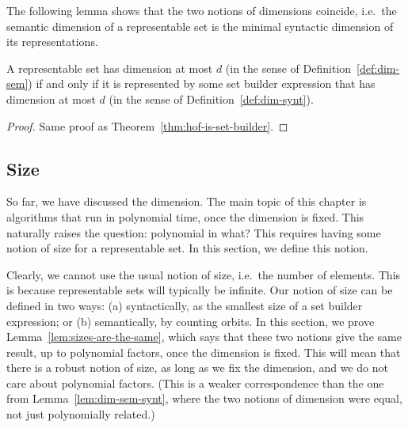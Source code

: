 The following lemma shows that the two notions of  dimensions coincide, i.e.~the semantic dimension of a representable  set is the minimal syntactic dimension of its representations.

\begin{lemma}\label{lem:dim-sem-synt}
    A representable set has dimension at most $d$ (in the sense of Definition~\ref{def:dim-sem}) if and only if it is represented by some set builder expression that has dimension at most $d$ (in the sense of Definition~\ref{def:dim-synt}). 
\end{lemma}
\begin{proof}
    Same proof as Theorem~\ref{thm:hof-is-set-builder}.
\end{proof}

\subsection{Size}
So far, we have discussed the dimension. The main topic of this chapter is algorithms that run in polynomial time, once the dimension is fixed. This naturally raises the question: polynomial in what? This requires having some notion of size for a representable set. In this section, we define this notion. 

Clearly, we cannot use the usual notion of size, i.e.~the number of elements. This is because representable sets  will typically be infinite. Our notion of size can be defined in two ways: (a) syntactically, as the smallest size of a set builder expression; or (b) semantically, by counting orbits. In this section, we prove Lemma~\ref{lem:sizes-are-the-same}, which says that  these two notions give the same result, up to polynomial factors, once the dimension is fixed. This will mean that there is a robust notion of size, as long as we fix the dimension, and we do not care about polynomial factors. (This is a weaker correspondence than the one from Lemma~\ref{lem:dim-sem-synt}, where the two notions of dimension were equal, not just polynomially related.)





